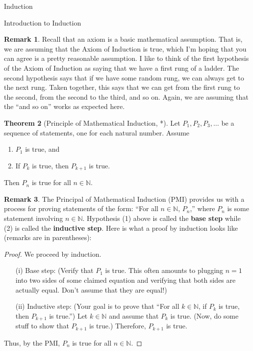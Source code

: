 \documentclass[11pt]{article}
\theoremstyle{definition}
\newtheorem{theorem}{Theorem}[section]
\newtheorem{remark}[theorem]{Remark}
\begin{document}
\begin{section}{Induction}
\begin{subsection}{Introduction to Induction}
\begin{remark}
Recall that an axiom is a basic mathematical assumption.  That is, we are assuming that the Axiom of Induction is true, which I'm hoping that you can agree is a pretty reasonable assumption.  I like to think of the first hypothesis of the Axiom of Induction as saying that we have a first rung of a ladder.  The second hypothesis says that if we have some random rung, we can always get to the next rung.  Taken together, this says that we can get from the first rung to the second, from the second to the third, and so on.  Again, we are assuming that the ``and so on'' works as expected here.
\end{remark}

\begin{theorem}[Principle of Mathematical Induction, *]
Let $P_{1}, P_{2}, P_{3}, \ldots$ be a sequence of statements, one for each natural number.  Assume
\begin{enumerate}
\item $P_{1}$ is true, and
\item If $P_{k}$ is true, then $P_{k+1}$ is true.
\end{enumerate}
Then $P_{n}$ is true for all $n\in\mathbb{N}$.
\end{theorem}

\begin{remark}
The Principal of Mathematical Induction (PMI) provides us with a process for proving statements of the form: ``For all $n\in\mathbb{N}$, $P_{n}$,'' where $P_{n}$ is some statement involving $n\in \mathbb{N}$.  Hypothesis (1) above is called the \textbf{base step} while (2) is called the \textbf{inductive step}.  Here is what a proof by induction looks like (remarks are in parentheses):

\bigskip

\begin{proof}
We proceed by induction.
\begin{enumerate}
\item[(i)] Base step: (Verify that $P_{1}$ is true.  This often amounts to plugging $n=1$ into two sides of some claimed equation and verifying that both sides are actually equal.  Don't assume that they are equal!)

\item[(ii)] Inductive step:  (Your goal is to prove that ``For all $k\in\mathbb{N}$, if $P_{k}$ is true, then $P_{k+1}$ is true.'')  Let $k\in\mathbb{N}$ and assume that $P_{k}$ is true.  (Now, do some stuff to show that $P_{k+1}$ is true.)  Therefore, $P_{k+1}$ is true.
\end{enumerate}
Thus, by the PMI, $P_{n}$ is true for all $n\in\mathbb{N}$.
\end{proof}


\end{remark}
\end{subsection}
\end{section}
\end{document}
